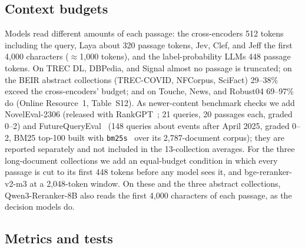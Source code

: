 \subsection{Context budgets}

Models read different amounts of each passage: the cross-encoders 512 tokens including the query, Laya about 320 passage tokens, Jev, Clef, and Jeff the first 4{,}000 characters ($\approx$1{,}000 tokens), and the label-probability LLMs 448 passage tokens.
On TREC DL, DBPedia, and Signal almost no passage is truncated; on the BEIR abstract collections (TREC-COVID, NFCorpus, SciFact) 29--38\% exceed the cross-encoders' budget; and on Touche, News, and Robust04 69--97\% do (Online Resource~1, Table~S12).
As newer-content benchmark checks we add NovelEval-2306 (released with RankGPT~\cite{sun2023rankgpt}; 21 queries, 20 passages each, graded 0--2) and FutureQueryEval~\cite{abdallah2025futurequery} (148 queries about events after April 2025, graded 0--2, BM25 top-100 built with \texttt{bm25s}~\cite{lu2024bm25s} over its 2{,}787-document corpus); they are reported separately and not included in the 13-collection averages.
For the three long-document collections we add an equal-budget condition in which every passage is cut to its first 448 tokens before any model sees it, and bge-reranker-v2-m3 at a 2{,}048-token window. On these and the three abstract collections, Qwen3-Reranker-8B also reads the first 4{,}000 characters of each passage, as the decision models do.

\subsection{Metrics and tests}

